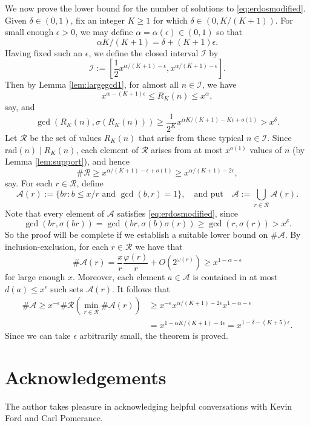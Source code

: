 \documentclass[12pt]{amsart}
\theoremstyle{definition}
\theoremstyle{remark}
\renewcommand\phi\varphi
\newcommand{\rad}{\mathrm{rad}}
\newcommand{\A}{\mathcal{A}}
\newcommand{\I}{\mathcal{I}}
\newcommand{\R}{\mathcal{R}}
\begin{document}
We now prove the lower bound for the number of solutions to \eqref{eq:erdosmodified}. Given $\delta \in (0,1)$, fix an integer $K \geq 1$ for which $\delta  \in (0,K/(K+1))$. For small enough $\epsilon > 0$, we may define $\alpha = \alpha(\epsilon) \in (0,1)$ so that
\[ \alpha K/(K+1) = \delta + (K+1)\epsilon. \]
Having fixed such an $\epsilon$, we define the closed interval $\I$ by
\[ \I:= \left[\frac{1}{2}x^{\alpha/(K+1)-\epsilon}, x^{\alpha/(K+1)-\epsilon}\right]. \]
Then by Lemma \ref{lem:largegcd1}, for almost all $n \in \mathcal{I}$, we have \[ x^{\alpha - (K+1)\epsilon} \leq R_K(n) \leq x^{\alpha}, \]
say, and
\[ \gcd(R_K(n), \sigma(R_{K}(n))) \geq \frac{1}{2^K} x^{\alpha K/(K+1) - K\epsilon + o(1)} > x^{\delta}.\]
Let $\R$ be the set of values $R_K(n)$ that arise from these typical $n \in \mathcal{I}$.
Since $\rad(n) \mid R_K(n)$, each element of $\R$ arises from at most $x^{o(1)}$ values of $n$ (by Lemma \ref{lem:support}), and hence
\[ \#\R \geq x^{\alpha/(K+1)-\epsilon+o(1)} \geq x^{\alpha/(K+1)-2\epsilon},\]
say. For each $r \in \R$, define
\[ \A(r):= \{br: b \leq x/r \text{ and } \gcd(b,r)=1\}, \quad \text{and put} \quad \A:= \bigcup_{r \in \R} \A(r). \]
Note that every element of $\A$ satisfies \eqref{eq:erdosmodified}, since
\[ \gcd(br, \sigma(br)) = \gcd(br, \sigma(b)\sigma(r)) \geq \gcd(r,\sigma(r)) > x^{\delta}.\]
So the proof will be complete if we establish a suitable lower bound on $\#\A$.
By inclusion-exclusion, for each $r \in \R$ we have that
\[ \#\A(r) = \frac{x}{r} \frac{\phi(r)}{r} + O(2^{\omega(r)}) \geq x^{1-\alpha- \epsilon} \]
for large enough $x$.  Moreover, each element $a \in \A$ is contained in at most $d(a) \leq x^{\epsilon}$ such sets $\A(r)$. It follows that
\begin{align*} \#\A \geq x^{-\epsilon} \#\R \left(\min_{r\in \R} \#\A(r)\right) &\geq x^{-\epsilon} x^{\alpha/(K+1)-2\epsilon} x^{1-\alpha - \epsilon} \\ &= x^{1-\alpha K /(K+1) - 4\epsilon} = x^{1-\delta - (K+5)\epsilon}.\end{align*}
Since we can take $\epsilon$ arbitrarily small, the theorem is proved.

\section*{Acknowledgements}
The author takes pleasure in acknowledging helpful conversations with Kevin Ford and Carl Pomerance.


\end{document}
